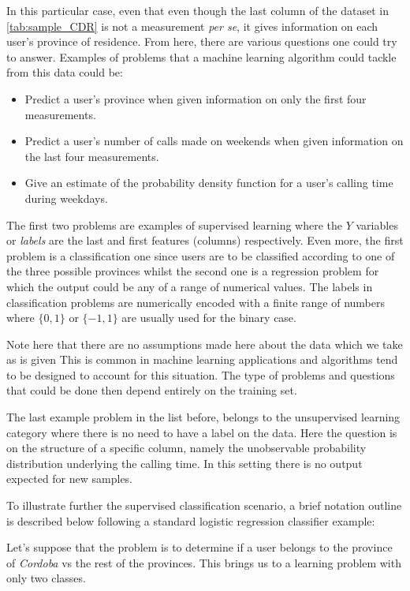 In this particular case, even that even though the last column of the dataset in \ref{tab:sample_CDR} is not a measurement \textit{per se}, it gives information on each user's province of residence. From here, there are various questions one could try to answer. Examples of problems that a machine learning algorithm could tackle from this data could be: 

\begin{itemize}
	\item Predict a user's province when given information on only the first four measurements.
	\item Predict a user's number of calls made on weekends when given information on the last four measurements.
	\item Give an estimate of the probability density function for a user's calling time during weekdays.
\end{itemize}

The first two problems are examples of supervised learning where the $Y$ variables or \textit{labels} are the last and first features (columns) respectively. Even more, the first problem is a classification one since users are to be classified according to one of the three possible provinces whilst the second one is a regression problem for which the output could be any of a range of numerical values. The labels in classification problems are numerically encoded with a finite range of numbers where $\{0,1\}$ or $\{-1,1\}$ are usually used for the binary case.

Note here that there are no assumptions made here about the data which we take as is given %
This is common in machine learning applications and algorithms tend to be designed to account for this situation. The type of problems and questions that could be done then depend entirely on the training set. 

The last example problem in the list before, belongs to the unsupervised learning category where there is no need to have a label on the data. Here the question is on the structure of a specific column, namely the unobservable probability distribution underlying the calling time. In this setting there is no output expected for new samples.

To illustrate further the supervised classification scenario, a brief notation outline is described below following a standard logistic regression classifier example:

Let's suppose that the problem is to determine if a user belongs to the province of \textit{Cordoba} vs the rest of the provinces. This brings us to a learning problem with only two classes. %
 
